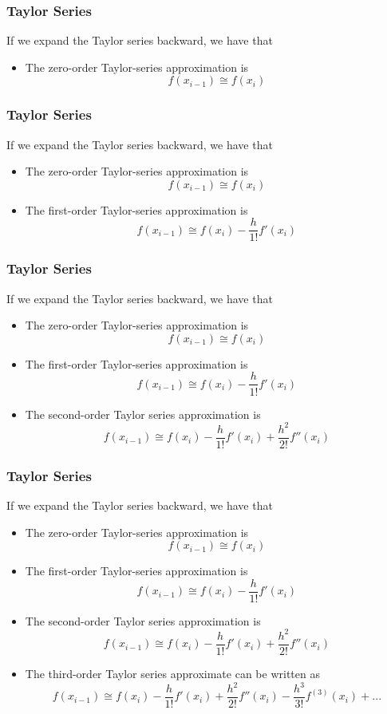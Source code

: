 \documentclass{if-beamer}
\begin{document}

\begin{frame}[t]
	\frametitle{Taylor Series}
	
	If we expand the Taylor series backward, we have that 
	\begin{itemize}
		\item 	The zero-order Taylor-series approximation is
		$$f(x_{i-1}) \cong f(x_i) $$
	\end{itemize}	
	
\end{frame}

\begin{frame}[t]
	\frametitle{Taylor Series}
	
	If we expand the Taylor series backward, we have that 
	\begin{itemize}
		\item 	The zero-order Taylor-series approximation is
		$$f(x_{i-1}) \cong f(x_i) $$
		\item The first-order Taylor-series approximation is
		$$f(x_{i-1}) \cong f(x_i) -\frac{h}{1!}f'(x_i) $$
	\end{itemize}	
	
\end{frame}

\begin{frame}[t]
	\frametitle{Taylor Series}
	
	If we expand the Taylor series backward, we have that 
	\begin{itemize}
		\item 	The zero-order Taylor-series approximation is
		$$f(x_{i-1}) \cong f(x_i) $$
		\item The first-order Taylor-series approximation is
		$$f(x_{i-1}) \cong f(x_i) -\frac{h}{1!}f'(x_i) $$
		\item The second-order Taylor series approximation is 
		$$f(x_{i-1}) \cong f(x_i) -\frac{h}{1!}f'(x_i) + \frac{h^2}{2!}f''(x_i)$$
	\end{itemize}	
	
\end{frame}

\begin{frame}[t]
	\frametitle{Taylor Series}
	
	If we expand the Taylor series backward, we have that 
	\begin{itemize}
		\item 	The zero-order Taylor-series approximation is
		$$f(x_{i-1}) \cong f(x_i) $$
		\item The first-order Taylor-series approximation is
		$$f(x_{i-1}) \cong f(x_i) -\frac{h}{1!}f'(x_i) $$
		\item The second-order Taylor series approximation is 
		$$f(x_{i-1}) \cong f(x_i) -\frac{h}{1!}f'(x_i) + \frac{h^2}{2!}f''(x_i)$$
		\item The third-order Taylor series approximate can be written as
		$$f(x_{i-1}) \cong f(x_i) - \frac{h}{1!}f'(x_i) + \frac{h^2}{2!}f''(x_i)-\frac{h^3}{3!}f^{(3)}(x_i)+...$$
	\end{itemize}	
	
\end{frame}
\end{document}
